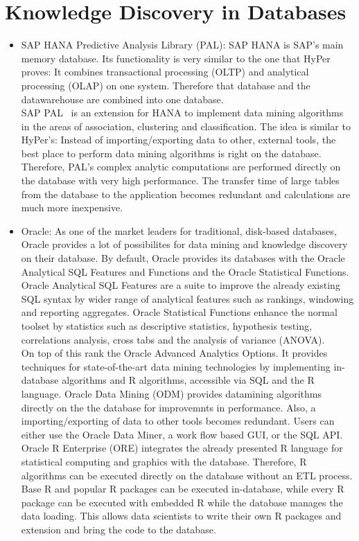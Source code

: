 \section{Knowledge Discovery in Databases}
\begin{itemize}
\item SAP HANA Predictive Analysis Library (PAL): SAP HANA is SAP's main memory database. Its functionality is very similar to the one that HyPer proves: It combines transactional processing (OLTP) and analytical processing (OLAP) on one system. Therefore that database and the datawarehouse are combined into one database. 
\\
SAP PAL~\parencite{pal} is an extension for HANA to implement data mining algorithms in the areas of association, clustering and classification. The idea is similar to HyPer's: Instead of importing/exporting data to other, external tools, the best place to perform data mining algorithms is right on the database. Therefore, PAL's complex analytic computations are performed directly on the database with very high performance. The transfer time of large tables from the database to the application becomes redundant and calculations are much more inexpensive.

\item Oracle: As one of the market leaders for traditional, disk-based databases, Oracle provides a lot of possibilites for data mining and knowledge discovery on their database. By default, Oracle provides its databases with the Oracle Analytical SQL Features and Functions and the Oracle Statistical Functions. Oracle Analytical SQL Features are a suite to improve the already existing SQL syntax by wider range of analytical features such as rankings, windowing and reporting aggregates. Oracle Statistical Functions enhance the normal toolset by statistics such as descriptive statistics, hypothesis testing, correlations analysis, cross tabs and the analysis of variance (ANOVA). 
\\
On top of this rank the Oracle Advanced Analytics Options. It provides techniques for state-of-the-art data mining technologies by implementing in-database algorithms and R algorithms, accessible via SQL and the R language. Oracle Data Mining (ODM) provides datamining algorithms directly on the the database for improvemnts in performance. Also, a importing/exporting of data to other tools becomes redundant. Users can either use the Oracle Data Miner, a work flow based GUI, or the SQL API. Oracle R Enterprise (ORE) integrates the already presented R language for statistical computing and graphics with the database. Therefore, R algorithms can be executed directly on the database without an ETL process. Base R and popular R packages can be executed in-database, while every R package can be executed with embedded R while the database manages the data loading. This allows data scientists to write their own R packages and extension and bring the code to the database.

\end{itemize}

